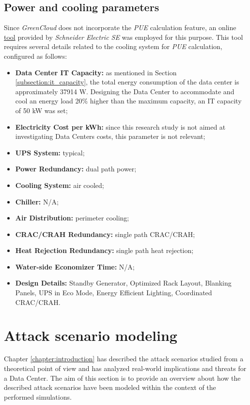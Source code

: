 \subsection{Power and cooling parameters} \label{subsection:powercooling}
Since \emph{GreenCloud} does not incorporate the \emph{PUE} calculation feature, an online \href{https://www.se.com/ww/en/work/solutions/system/s1/data-center-and-network-systems/trade-off-tools/data-center-efficiency-and-pue-calculator/}{tool} provided by \emph{Schneider Electric SE} was employed for this purpose. This tool requires several details related to the cooling system for \emph{PUE} calculation, configured as follows:
\begin{itemize}
    \item \textbf{Data Center IT Capacity:} as mentioned in Section \ref{subsection:it_capacity}, the total energy consumption of the data center is approximately 37914 W. Designing the Data Center to accommodate and cool an energy load 20\% higher than the maximum capacity, an IT capacity of 50 kW was set;
    \item \textbf{Electricity Cost per kWh:} since this research study is not aimed at investigating Data Centers costs, this parameter is not relevant;
    \item \textbf{UPS System:} typical;
    \item \textbf{Power Redundancy:} dual path power;
    \item \textbf{Cooling System:} air cooled;
    \item \textbf{Chiller:} N/A;
    \item \textbf{Air Distribution:} perimeter cooling;
    \item \textbf{CRAC/CRAH Redundancy:} single path CRAC/CRAH;
    \item \textbf{Heat Rejection Redundancy:} single path heat rejection;
    \item \textbf{Water-side Economizer Time:} N/A;
    \item \textbf{Design Details:} Standby Generator, Optimized Rack Layout, Blanking Panels, UPS in Eco Mode, Energy Efficient Lighting, Coordinated CRAC/CRAH.
\end{itemize}

\section{Attack scenario modeling}
Chapter \ref{chapter:introduction} has described the attack scenarios studied from a theoretical point of view and has analyzed real-world implications and threats for a Data Center. The aim of this section is to provide an overview about how the described attack scenarios have been modeled within the context of the performed simulations.

